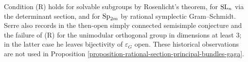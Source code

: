 \begin{remark}
\label{remark-rational-section-condition-examples}
Condition \textup{(R)} holds for solvable subgroups by Rosenlicht's theorem,
for $\mathop{\rm SL}_n$ via the determinant section, and for
$\mathop{\rm Sp}_{2m}$ by rational symplectic Gram--Schmidt. Serre also
records in \cite[\S 4, no. 20]{GAGA} the then-open simply connected
semisimple conjecture and the failure of \textup{(R)} for the unimodular
orthogonal group in dimensions at least $3$; in the latter case he leaves
bijectivity of $\varepsilon_G$ open. These historical observations are not
used in Proposition
\ref{proposition-rational-section-principal-bundles-gaga}.
\end{remark}







